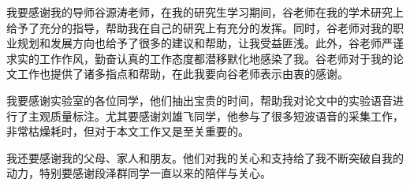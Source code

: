 \begin{acknowledgement}

我要感谢我的导师谷源涛老师，在我的研究生学习期间，谷老师在我的学术研究上给予了充分的指导，帮助我在自己的研究上有充分的发挥。同时，谷老师对我的职业规划和发展方向也给予了很多的建议和帮助，让我受益匪浅。此外，谷老师严谨求实的工作作风，勤奋认真的工作态度都潜移默化地感染了我。谷老师对于我的论文工作也提供了诸多指点和帮助，在此我要向谷老师表示由衷的感谢。

我要感谢实验室的各位同学，他们抽出宝贵的时间，帮助我对论文中的实验语音进行了主观质量标注。尤其要感谢刘雄飞同学，他参与了很多短波语音的采集工作，非常枯燥耗时，但对于本文工作又是至关重要的。

我还要感谢我的父母、家人和朋友。他们对我的关心和支持给了我不断突破自我的动力，特别要感谢段泽群同学一直以来的陪伴与关心。

\end{acknowledgement}
